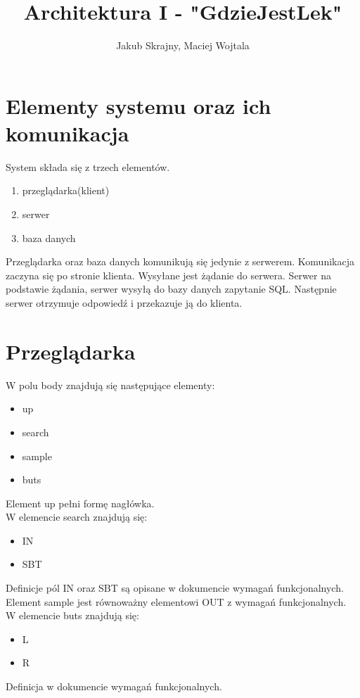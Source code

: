 \documentclass[10pt, a4paper]{article}
\author{Jakub Skrajny, Maciej Wojtala}
\title{Architektura I - "GdzieJestLek"}
\begin{document}
\maketitle
\section{Elementy systemu oraz ich komunikacja}
System składa się z trzech elementów.\\
\begin{enumerate}
\item przeglądarka(klient)
\item serwer
\item baza danych
\end{enumerate}
Przeglądarka oraz baza danych komunikują się jedynie z serwerem. Komunikacja zaczyna się po stronie klienta.
Wysyłane jest żądanie do serwera. Serwer na podstawie żądania, serwer wysyłą do bazy danych zapytanie SQL.
Następnie serwer otrzymuje odpowiedź i przekazuje ją do klienta.
\section{Przeglądarka}
W polu body znajdują się następujące elementy:\\
\begin{itemize}
\item up
\item search
\item sample
\item buts
\end{itemize}
Element up pełni formę nagłówka.\\
W elemencie search znajdują się:
\begin{itemize}
\item IN
\item SBT
\end{itemize}
Definicje pól IN oraz SBT są opisane w dokumencie wymagań funkcjonalnych. \\
Element sample jest równoważny elementowi OUT z wymagań funkcjonalnych.\\
W elemencie buts znajdują się:
\begin{itemize}
\item L
\item R
\end{itemize}
Definicja w dokumencie wymagań funkcjonalnych.\\
\end{document}
